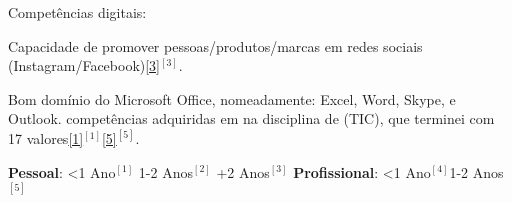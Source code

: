 \begin{cventries}
  \cventry
    {Competências digitais:} %
    {} 
    {} 
    {} 
    {
      \vspace{0.4cm}
      \begin{cvitems} %
        \item {Capacidade de promover pessoas/produtos/marcas em redes sociais (Instagram/Facebook)\ref{3}{$^{[3]}$}.}
        \item {Bom domínio do Microsoft Office, nomeadamente: Excel, Word, Skype, e Outlook. competências adquiridas em na disciplina de (TIC), que terminei com 17 valores\ref{1}{$^{[1]}$}\ref{5}{$^{[5]}$}.} 
      \end{cvitems}
    }  
  \vspace{-0.2cm} 


  \cventry
    {} %
    {} 
    {} 
    {} 
    {
      \begin{cvitems} %
        \item[]{\textbf{Pessoal}: \label{1}{<1 Ano$^{[1]}$} \label{2}{1-2 Anos$^{[2]}$} \label{3}{+2 Anos$^{[3]}$}
		\hspace{2.2cm}
		\textbf{Profissional}: \label{4}{<1 Ano$^{[4]}$}\label{5}{1-2 Anos$^{[5]}$}}		
      \end{cvitems}
    }  
  \vspace{0.2cm} 
      

\end{cventries}
